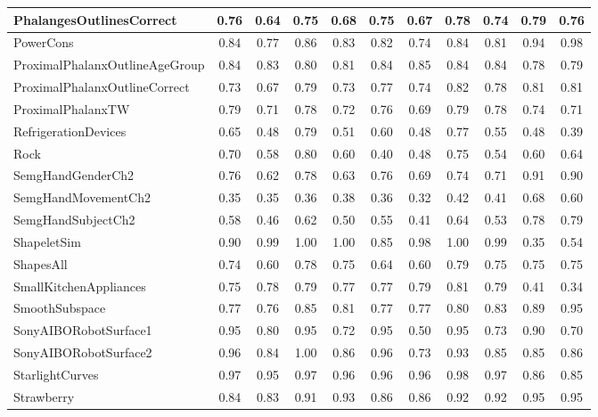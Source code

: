 \begin{table}
{\begin{tabular}{lcccccccccc}
        PhalangesOutlinesCorrect & 0.76 & 0.64 & 0.75 & 0.68 & 0.75 & 0.67 & 0.78 & 0.74 & 0.79 & 0.76 \\ \hline
        PowerCons & 0.84 & 0.77 & 0.86 & 0.83 & 0.82 & 0.74 & 0.84 & 0.81 & 0.94 & 0.98 \\ \hline
        ProximalPhalanxOutlineAgeGroup & 0.84 & 0.83 & 0.80 & 0.81 & 0.84 & 0.85 & 0.84 & 0.84 & 0.78 & 0.79 \\ \hline
        ProximalPhalanxOutlineCorrect & 0.73 & 0.67 & 0.79 & 0.73 & 0.77 & 0.74 & 0.82 & 0.78 & 0.81 & 0.81 \\ \hline
        ProximalPhalanxTW & 0.79 & 0.71 & 0.78 & 0.72 & 0.76 & 0.69 & 0.79 & 0.78 & 0.74 & 0.71 \\ \hline
        RefrigerationDevices & 0.65 & 0.48 & 0.79 & 0.51 & 0.60 & 0.48 & 0.77 & 0.55 & 0.48 & 0.39 \\ \hline
        Rock & 0.70 & 0.58 & 0.80 & 0.60 & 0.40 & 0.48 & 0.75 & 0.54 & 0.60 & 0.64 \\ \hline
        SemgHandGenderCh2 & 0.76 & 0.62 & 0.78 & 0.63 & 0.76 & 0.69 & 0.74 & 0.71 & 0.91 & 0.90 \\ \hline
        SemgHandMovementCh2 & 0.35 & 0.35 & 0.36 & 0.38 & 0.36 & 0.32 & 0.42 & 0.41 & 0.68 & 0.60 \\ \hline
        SemgHandSubjectCh2 & 0.58 & 0.46 & 0.62 & 0.50 & 0.55 & 0.41 & 0.64 & 0.53 & 0.78 & 0.79 \\ \hline
        ShapeletSim & 0.90 & 0.99 & 1.00 & 1.00 & 0.85 & 0.98 & 1.00 & 0.99 & 0.35 & 0.54 \\ \hline
        ShapesAll & 0.74 & 0.60 & 0.78 & 0.75 & 0.64 & 0.60 & 0.79 & 0.75 & 0.75 & 0.75 \\ \hline
        SmallKitchenAppliances & 0.75 & 0.78 & 0.79 & 0.77 & 0.77 & 0.79 & 0.81 & 0.79 & 0.41 & 0.34 \\ \hline
        SmoothSubspace & 0.77 & 0.76 & 0.85 & 0.81 & 0.77 & 0.77 & 0.80 & 0.83 & 0.89 & 0.95 \\ \hline
        SonyAIBORobotSurface1 & 0.95 & 0.80 & 0.95 & 0.72 & 0.95 & 0.50 & 0.95 & 0.73 & 0.90 & 0.70 \\ \hline
        SonyAIBORobotSurface2 & 0.96 & 0.84 & 1.00 & 0.86 & 0.96 & 0.73 & 0.93 & 0.85 & 0.85 & 0.86 \\ \hline
        StarlightCurves & 0.97 & 0.95 & 0.97 & 0.96 & 0.96 & 0.96 & 0.98 & 0.97 & 0.86 & 0.85 \\ \hline
        Strawberry & 0.84 & 0.83 & 0.91 & 0.93 & 0.86 & 0.86 & 0.92 & 0.92 & 0.95 & 0.95 \\ \hline

\end{tabular}}
\end{table}

